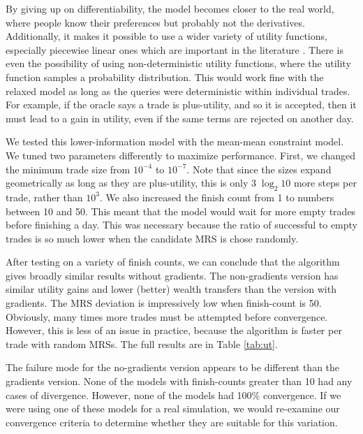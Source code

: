 \documentclass[12pt,a4paper,titlepage]{article}
\begin{document}
By giving up on differentiability, the model becomes closer to the real world, where people know their preferences but probably not the derivatives.
Additionally, it makes it possible to use a wider variety of utility functions, especially piecewise linear ones which are important in the literature \cite{chen}.
There is even the possibility of using non-deterministic utility functions, where the utility function samples a probability distribution.
This would work fine with the relaxed model as long as the queries were deterministic within individual trades.
For example, if the oracle says a trade is plus-utility, and so it is accepted, then it must lead to a gain in utility, even if the same terms are rejected on another day.

We tested this lower-information model with the mean-mean constraint model.
We tuned two parameters differently to maximize performance. 
First, we changed the minimum trade size from $10^{-4}$ to $10^{-7}$.
Note that since the sizes expand geometrically as long as they are plus-utility, this is only $3 \; \log_2 10$ more steps per trade, rather than $10^3$.
We also increased the finish count from 1 to numbers between 10 and 50.
This meant that the model would wait for more empty trades before finishing a day.
This was necessary because the ratio of successful to empty trades is so much lower when the candidate MRS is chose randomly.


After testing on a variety of finish counts, we can conclude that the algorithm gives broadly similar results without gradients. 
The non-gradients version has similar utility gains and lower (better) wealth transfers than the version with gradients.
The MRS deviation is impressively low when finish-count is 50.
Obviously, many times more trades must be attempted before convergence.
However, this is less of an issue in practice, because the algorithm is faster per trade with random MRSs.
The full results are in Table \ref{tab:ut}.

The failure mode for the no-gradients version appears to be different than the gradients version.
None of the models with finish-counts greater than 10 had any cases of divergence.
However, none of the models had 100\% convergence.
If we were using one of these models for a real simulation, we would re-examine our convergence criteria to determine whether they are suitable for this variation.
\end{document}
